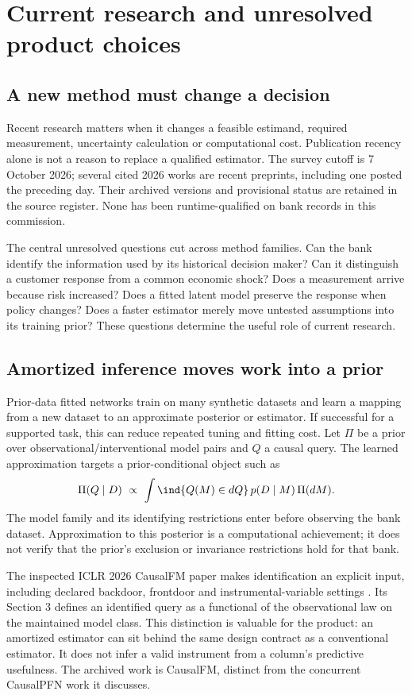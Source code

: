\chapter{Current research and unresolved product choices}\label{ch:frontier}
\section{A new method must change a decision}
Recent research matters when it changes a feasible estimand, required
measurement, uncertainty calculation or computational cost. Publication
recency alone is not a reason to replace a qualified estimator. The survey
cutoff is 7 October 2026; several cited 2026 works are recent preprints,
including one posted the preceding day. Their archived versions and
provisional status are retained in the source register. None has been
runtime-qualified on bank records in this commission.

The central unresolved questions cut across method families. Can the bank
identify the information used by its historical decision maker? Can it
distinguish a customer response from a common economic shock? Does a
measurement arrive because risk increased? Does a fitted latent model
preserve the response when policy changes? Does a faster estimator merely
move untested assumptions into its training prior? These questions determine
the useful role of current research.

\section{Amortized inference moves work into a prior}
Prior-data fitted networks train on many synthetic datasets and learn a
mapping from a new dataset to an approximate posterior or estimator.
If successful for a supported task, this can reduce repeated tuning and
fitting cost. Let $\Pi$ be a prior over observational/interventional
model pairs and $Q$ a causal query. The learned approximation targets a
prior-conditional object such as
\[
 \Pi(Q\mid D)\ \propto\ \int
       \ind\{Q(M)\in dQ\}\,p(D\mid M)\,\Pi(dM).
\]
The model family and its identifying restrictions enter before observing
the bank dataset. Approximation to this posterior is a computational
achievement; it does not verify that the prior's exclusion or invariance
restrictions hold for that bank.

The inspected ICLR 2026 CausalFM paper makes identification an explicit
input, including declared backdoor, frontdoor and instrumental-variable
settings \citep{causalpfn2026}. Its Section 3 defines an identified query
as a functional of the observational law on the maintained model class.
This distinction is valuable for the product: an amortized estimator can
sit behind the same design contract as a conventional estimator.
It does not infer a valid instrument from a column's predictive usefulness.
The archived work is CausalFM, distinct from the concurrent CausalPFN
work it discusses.

